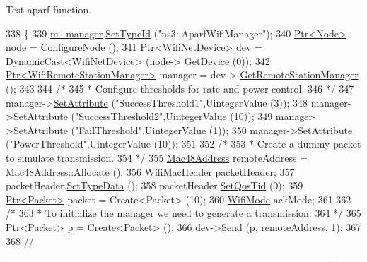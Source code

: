 Test aparf function. 


\begin{DoxyCode}
338 \{
339   \hyperlink{classPowerRateAdaptationTest_afa9f7fb131c12b88efa24138930c50b3}{m\_manager}.\hyperlink{classns3_1_1ObjectFactory_a77dcd099064038a1eb7a6b8251229ec3}{SetTypeId} (\textcolor{stringliteral}{"ns3::AparfWifiManager"});
340   \hyperlink{classns3_1_1Ptr}{Ptr<Node>} node = \hyperlink{classPowerRateAdaptationTest_a498edc12eed6e91b38d1b71d4565a306}{ConfigureNode} ();
341   \hyperlink{classns3_1_1Ptr}{Ptr<WifiNetDevice>} dev = DynamicCast<WifiNetDevice> (node->
      \hyperlink{classns3_1_1Node_a5918dfd24ef632efc9a83a5f6561c76e}{GetDevice} (0));
342   \hyperlink{classns3_1_1Ptr}{Ptr<WifiRemoteStationManager>} manager = dev->
      \hyperlink{classns3_1_1WifiNetDevice_a8b8bb06504a6d76552dd626103b1e5fd}{GetRemoteStationManager} ();
343 
344   \textcolor{comment}{/*}
345 \textcolor{comment}{   * Configure thresholds for rate and power control.}
346 \textcolor{comment}{   */}
347   manager->\hyperlink{classns3_1_1ObjectBase_ac60245d3ea4123bbc9b1d391f1f6592f}{SetAttribute} (\textcolor{stringliteral}{"SuccessThreshold1"},UintegerValue (3));
348   manager->SetAttribute (\textcolor{stringliteral}{"SuccessThreshold2"},UintegerValue (10));
349   manager->SetAttribute (\textcolor{stringliteral}{"FailThreshold"},UintegerValue (1));
350   manager->SetAttribute (\textcolor{stringliteral}{"PowerThreshold"},UintegerValue (10));
351 
352   \textcolor{comment}{/*}
353 \textcolor{comment}{   * Create a dummy packet to simulate transmission.}
354 \textcolor{comment}{   */}
355   \hyperlink{classns3_1_1Mac48Address}{Mac48Address} remoteAddress = Mac48Address::Allocate ();
356   \hyperlink{classns3_1_1WifiMacHeader}{WifiMacHeader} packetHeader;
357   packetHeader.\hyperlink{classns3_1_1WifiMacHeader_a8bc4915d867ea16df7c110a87c534c27}{SetTypeData} ();
358   packetHeader.\hyperlink{classns3_1_1WifiMacHeader_a84a98932f5b66cca86bdfaa9cb1bcf7b}{SetQosTid} (0);
359   \hyperlink{classns3_1_1Ptr}{Ptr<Packet>} packet = Create<Packet> (10);
360   \hyperlink{classns3_1_1WifiMode}{WifiMode} ackMode;
361 
362   \textcolor{comment}{/*}
363 \textcolor{comment}{   * To initialize the manager we need to generate a transmission.}
364 \textcolor{comment}{   */}
365   \hyperlink{classns3_1_1Ptr}{Ptr<Packet>} \hyperlink{lte__link__budget_8m_ac9de518908a968428863f829398a4e62}{p} = Create<Packet> ();
366   dev->\hyperlink{classns3_1_1WifiNetDevice_a14b6919a10da25e74e1c92554106b2c6}{Send} (p, remoteAddress, 1);
367 
368   \textcolor{comment}{//-----------------------------------------------------------------------------------------------------}

\end{DoxyCode}
